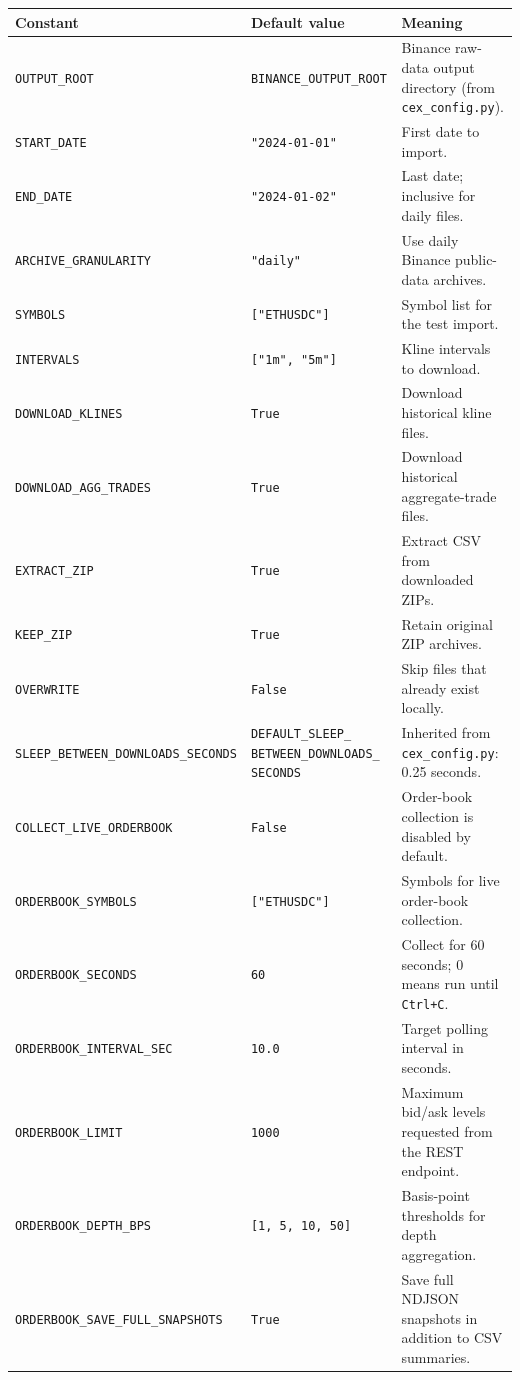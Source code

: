 \documentclass[11pt,a4paper]{article}
\begin{document}
\begin{xltabular}{\linewidth}{L{4.8cm}L{3.0cm}Y}
\toprule
\textbf{Constant} & \textbf{Default value} & \textbf{Meaning} \\
\midrule
\texttt{OUTPUT\_ROOT} & \texttt{BINANCE\_OUTPUT\_ROOT} &
  Binance raw-data output directory (from \texttt{cex\_config.py}). \\
\texttt{START\_DATE} & \texttt{"2024-01-01"} &
  First date to import. \\
\texttt{END\_DATE} & \texttt{"2024-01-02"} &
  Last date; inclusive for daily files. \\
\texttt{ARCHIVE\_GRANULARITY} & \texttt{"daily"} &
  Use daily Binance public-data archives. \\
\texttt{SYMBOLS} & \texttt{["ETHUSDC"]} &
  Symbol list for the test import. \\
\texttt{INTERVALS} & \texttt{["1m", "5m"]} &
  Kline intervals to download. \\
\texttt{DOWNLOAD\_KLINES} & \texttt{True} &
  Download historical kline files. \\
\texttt{DOWNLOAD\_AGG\_TRADES} & \texttt{True} &
  Download historical aggregate-trade files. \\
\texttt{EXTRACT\_ZIP} & \texttt{True} &
  Extract CSV from downloaded ZIPs. \\
\texttt{KEEP\_ZIP} & \texttt{True} &
  Retain original ZIP archives. \\
\texttt{OVERWRITE} & \texttt{False} &
  Skip files that already exist locally. \\
\texttt{SLEEP\_BETWEEN\_DOWNLOADS\_SECONDS} &
  \texttt{DEFAULT\_SLEEP\_ BETWEEN\_DOWNLOADS\_ SECONDS} &
  Inherited from \texttt{cex\_config.py}: 0.25 seconds. \\
\texttt{COLLECT\_LIVE\_ORDERBOOK} & \texttt{False} &
  Order-book collection is disabled by default. \\
\texttt{ORDERBOOK\_SYMBOLS} & \texttt{["ETHUSDC"]} &
  Symbols for live order-book collection. \\
\texttt{ORDERBOOK\_SECONDS} & \texttt{60} &
  Collect for 60 seconds; 0 means run until \texttt{Ctrl+C}. \\
\texttt{ORDERBOOK\_INTERVAL\_SEC} & \texttt{10.0} &
  Target polling interval in seconds. \\
\texttt{ORDERBOOK\_LIMIT} & \texttt{1000} &
  Maximum bid/ask levels requested from the REST endpoint. \\
\texttt{ORDERBOOK\_DEPTH\_BPS} & \texttt{[1, 5, 10, 50]} &
  Basis-point thresholds for depth aggregation. \\
\texttt{ORDERBOOK\_SAVE\_FULL\_SNAPSHOTS} & \texttt{True} &
  Save full NDJSON snapshots in addition to CSV summaries. \\
\bottomrule
\end{xltabular}
\end{document}
